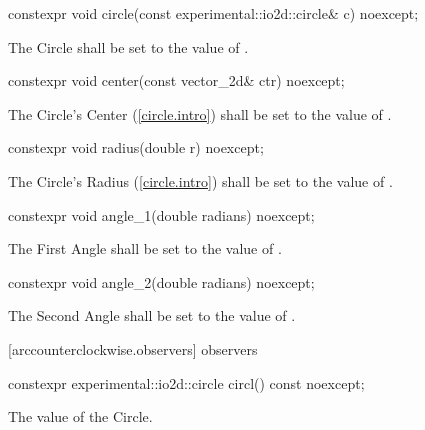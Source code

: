 \begin{itemdecl}
constexpr void circle(const experimental::io2d::circle& c) noexcept;
\end{itemdecl}
\begin{itemdescr}
\pnum
\effects
The Circle shall be set to the value of .
\end{itemdescr}

\begin{itemdecl}
constexpr void center(const vector_2d& ctr) noexcept;
\end{itemdecl}
\begin{itemdescr}
\pnum
\effects
The Circle's Center (\ref{circle.intro}) shall be set to the value of .
\end{itemdescr}

\begin{itemdecl}
constexpr void radius(double r) noexcept;
\end{itemdecl}
\begin{itemdescr}
\pnum
\effects
The Circle's Radius (\ref{circle.intro}) shall be set to the value of .
\end{itemdescr}

\begin{itemdecl}
constexpr void angle_1(double radians) noexcept;
\end{itemdecl}
\begin{itemdescr}
\pnum
\effects
The First Angle shall be set to the value of .
\end{itemdescr}

\begin{itemdecl}
constexpr void angle_2(double radians) noexcept;
\end{itemdecl}
\begin{itemdescr}
\pnum
\effects
The Second Angle shall be set to the value of .
\end{itemdescr}

 [arccounterclockwise.observers]{ observers}

\begin{itemdecl}
constexpr experimental::io2d::circle circl() const noexcept;
\end{itemdecl}
\begin{itemdescr}
\pnum
\returns
The value of the Circle.
\end{itemdescr}

